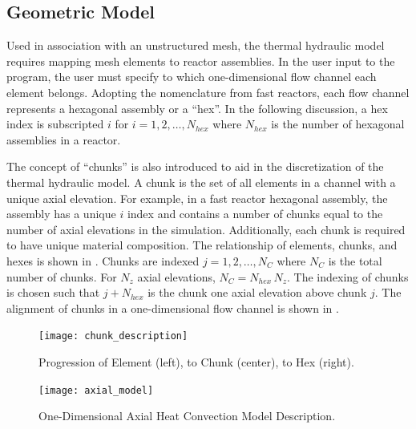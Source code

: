   \subsection{Geometric Model}
    Used in association with an unstructured mesh, the thermal hydraulic model
    requires mapping mesh elements to reactor assemblies. In the user input to
    the program, the user must specify to which one-dimensional flow channel 
    each element belongs.
    Adopting the nomenclature from fast reactors, each flow channel represents a
    hexagonal assembly or a ``hex''. In the following discussion, a hex index is
    subscripted $i$ for $i = 1,2,\ldots,N_{hex}$ where $N_{hex}$ is the number
    of hexagonal assemblies in a reactor. 

    The concept of ``chunks'' is also introduced to aid in the discretization of
    the thermal hydraulic model. A chunk is the set of all elements in a channel
    with a unique axial elevation. For example, in a fast reactor hexagonal
    assembly, the assembly has a unique $i$ index and contains a number of 
    chunks equal to the number of axial elevations in the simulation. 
    Additionally, each chunk is required to have unique material composition. 
    The relationship of elements, chunks, and hexes is shown in 
    . Chunks are indexed $j = 1,2,\ldots,N_C$ where
    $N_C$ is the total number of chunks.  For $N_z$ axial elevations, 
    $N_C = N_{hex} \, N_z$. The indexing of chunks is chosen such that 
    $j+N_{hex}$ is the chunk one axial elevation above chunk $j$. The alignment
    of chunks in a one-dimensional flow channel is shown in
    .

    \begin{figure}
      \centering
      \texttt{[image: chunk\_description]}
      \caption{Progression of Element (left), to Chunk (center), to Hex (right).}
      \label{fig:chunk_description}
    \end{figure}
    
    \begin{figure}
      \centering
      \texttt{[image: axial\_model]}
      \caption{One-Dimensional Axial Heat Convection Model Description.}
      \label{fig:axial_model}
    \end{figure}

